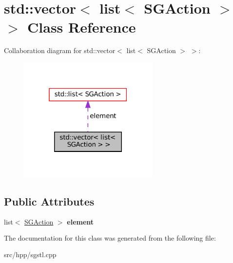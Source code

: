 \hypertarget{classstd_1_1vector_3_01list_3_01SGAction_01_4_01_4}{}\section{std\+:\+:vector$<$ list$<$ S\+G\+Action $>$ $>$ Class Reference}
\label{classstd_1_1vector_3_01list_3_01SGAction_01_4_01_4}


Collaboration diagram for std\+:\+:vector$<$ list$<$ S\+G\+Action $>$ $>$\+:
\nopagebreak
\begin{figure}[H]
\begin{center}
\leavevmode
\includegraphics[width=199pt]{classstd_1_1vector_3_01list_3_01SGAction_01_4_01_4__coll__graph}
\end{center}
\end{figure}
\subsection*{Public Attributes}
\begin{DoxyCompactItemize}
\item 
\mbox{\label{classstd_1_1vector_3_01list_3_01SGAction_01_4_01_4_aa8900d64de512f9aeb90ecc938f7f8c1}} 
list$<$ \hyperlink{classSGAction}{S\+G\+Action} $>$ {\bfseries element}
\end{DoxyCompactItemize}


The documentation for this class was generated from the following file\+:\begin{DoxyCompactItemize}
\item 
src/hpp/sgstl.\+cpp\end{DoxyCompactItemize}
